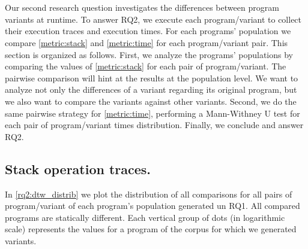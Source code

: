 \section{\rqtwo}



Our second research question investigates the differences between program variants at runtime.
To answer RQ2, we execute each program/variant to collect their execution traces and execution times.
For each programs' population we compare \autoref{metric:stack} and \autoref{metric:time} for each program/variant pair.
This section is organized as follows. First, we analyze the programs' populations by comparing the values of \autoref{metric:stack} for each pair of program/variant. The pairwise comparison will hint at the results at the population level. We want to analyze not only the differences of a variant regarding its original program, but we also want to compare the variants against other variants. Second, we do the same pairwise strategy for \autoref{metric:time}, performing a Mann-Withney U test for each pair of program/variant times distribution. Finally, we conclude and answer RQ2.

\subsection*{Stack operation traces.}

In \autoref{rq2:dtw_distrib} we plot the distribution of all \DTW comparisons for all pairs of program/variant of each program's population generated un RQ1. All compared programs are statically different. Each vertical group of dots (in logarithmic scale) represents the \DTW values for a program of the \corpusrosetta corpus for which we generated variants. 




